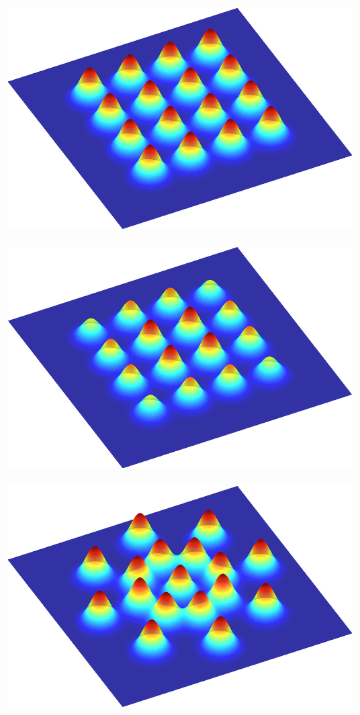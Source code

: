 \documentclass[thesis.tex]{subfiles}
\begin{document}
%
\begin{figure}[H]
    \centering
    \begin{subfigure}[t]{0.49\textwidth}
        \includegraphics[width=\textwidth]{img/cellLayoutSquare.png}
        \caption{}
        \label{fig:cellLayoutSquare}
    \end{subfigure}
	\begin{subfigure}[t]{0.49\textwidth}
        \includegraphics[width=\textwidth]{img/cellLayoutSquareCenter.png}
        \caption{}
        \label{fig:cellLayoutSquareCenter}
    \end{subfigure}
	\begin{subfigure}[t]{0.49\textwidth}
        \includegraphics[width=\textwidth]{img/cellLayoutPolar.png}

\end{subfigure}
\end{figure}
\end{document}

